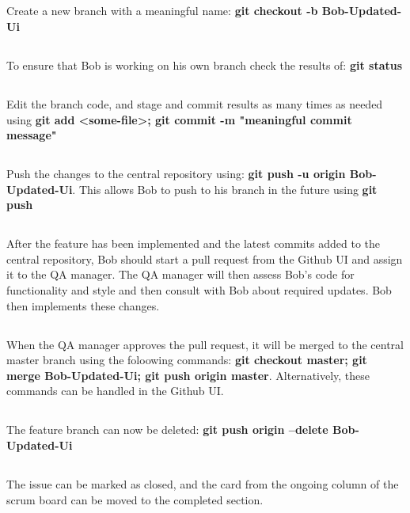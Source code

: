 \documentclass{article}
\begin{document}
    \subsection{} Create a new branch with a meaningful name: \textbf{git checkout -b Bob-Updated-Ui}
    \subsection{} To ensure that Bob is working on his own branch check the results of: \textbf{git status}
    \subsection{} Edit the branch code, and stage and commit results as many times as needed using \textbf{git add <some-file>; git commit -m "meaningful commit message"}
    \subsection{} Push the changes to the central repository using: \textbf{git push -u origin Bob-Updated-Ui}. \newline This allows Bob to push to his branch in the future using \textbf{git push}
    \subsection{} After the feature has been implemented and the latest commits added to the central repository, Bob should start a pull request from the Github UI and assign it to the QA manager. The QA manager will then assess Bob's code for functionality and style and then consult with Bob about required updates. Bob then implements these changes.
    \subsection{} When the QA manager approves the pull request, it will be merged to the central master branch using the foloowing commands: \textbf{git checkout master; git merge Bob-Updated-Ui; git push origin master}. Alternatively, these commands can be handled in the Github UI.
    \subsection{} The feature branch can now be deleted: \textbf{git push origin --delete Bob-Updated-Ui}    
    \subsection{} The issue can be marked as closed, and the card from the ongoing column of the scrum board can be moved to the completed section.
\end{document}
